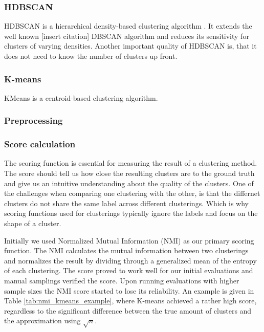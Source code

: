 \subsubsection{HDBSCAN}

HDBSCAN is a hierarchical density-based clustering algorithm \cite{McInnes2017}. It extends the well known [insert citation] DBSCAN algorithm and reduces its sensitivity for clusters of varying densities. Another important quality of HDBSCAN is, that it does not need to know the number of clusters up front.


\subsubsection{K-means}

KMeans is a centroid-based clustering algorithm. 


\subsubsection{Preprocessing}


\subsubsection{Score calculation}

The scoring function is essential for measuring the result of a clustering method. The score should tell us how close the resulting clusters are to the ground truth and give us an intuitive understanding about the quality of the clusters. One of the challenges when comparing one clustering with the other, is that the differnet clusters do not share the same label across different clusterings. Which is why scoring functions used for clusterings typically ignore the labels and focus on the shape of a cluster.

Initially we used Normalized Mutual Information (NMI) as our primary scoring function. The NMI calculates the mutual information between two clusterings and normalizes the result by dividing through a generalized mean of the entropy of each clustering. %
The score proved to work well for our initial evaluations and manual samplings verified the score. Upon running evaluations with higher sample sizes the NMI score started to lose its reliability. An example is given in Table \ref{tab:nmi_kmeans_example}, where K-means achieved a rather high score, regardless to the significant difference between the true amount of clusters and the approximation using $\sqrt{n}$.

